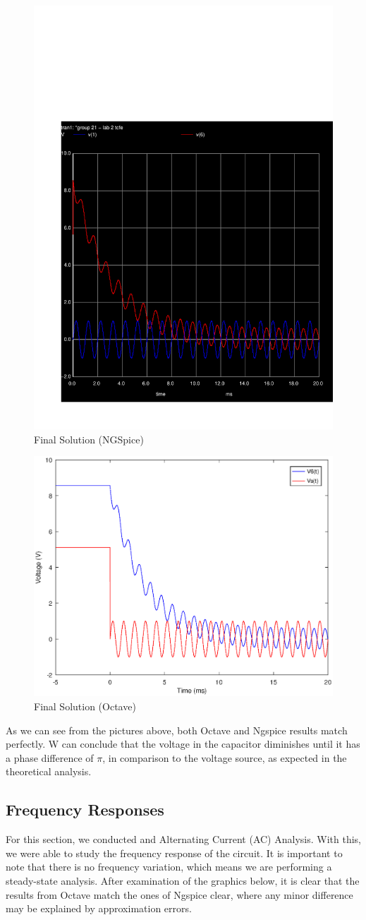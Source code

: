 \begin{figure}[h!] \centering
\includegraphics[width=0.5\linewidth]{question_4.pdf}
\caption{Final Solution (NGSpice)}
\label{fig:snat}
\end{figure}

\begin{figure}[h!] \centering
\includegraphics[width=0.6\linewidth]{forced_and_natural_solution.eps}
\caption{Final Solution (Octave)}
\label{fig:snat}
\end{figure}

As we can see from the pictures above, both Octave and Ngspice results match perfectly. W can conclude that the voltage in the capacitor diminishes until it has a phase difference of $\pi$, in comparison to the voltage source, as expected in the theoretical analysis.
\newpage
\subsection{Frequency Responses}

For this section, we conducted and Alternating Current (AC) Analysis. With this, we were able to study the frequency response of the circuit. It is important to note that there is no frequency variation, which means we are performing a steady-state analysis. After examination of the graphics below, it is clear that the results from Octave match the ones of Ngspice clear, where any minor difference may be explained by approximation errors.


